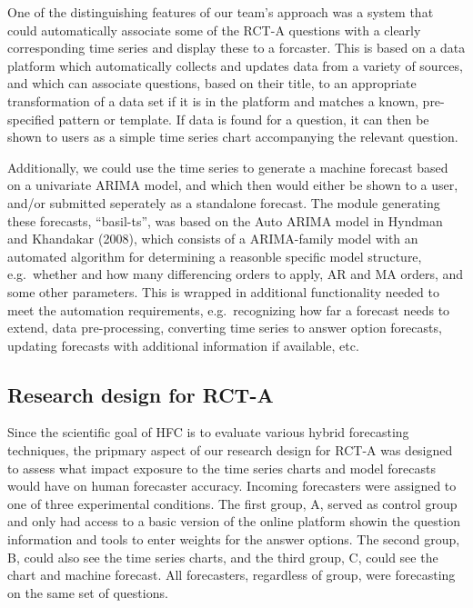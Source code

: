 \documentclass[]{article}
\begin{document}
One of the distinguishing features of our team's approach was a system
that could automatically associate some of the RCT-A questions with a
clearly corresponding time series and display these to a forcaster. This
is based on a data platform which automatically collects and updates
data from a variety of sources, and which can associate questions, based
on their title, to an appropriate transformation of a data set if it is
in the platform and matches a known, pre-specified pattern or template.
If data is found for a question, it can then be shown to users as a
simple time series chart accompanying the relevant question.

Additionally, we could use the time series to generate a machine
forecast based on a univariate ARIMA model, and which then would either
be shown to a user, and/or submitted seperately as a standalone
forecast. The module generating these forecasts, ``basil-ts'', was based
on the Auto ARIMA model in Hyndman and Khandakar (2008), which consists
of a ARIMA-family model with an automated algorithm for determining a
reasonble specific model structure, e.g.~whether and how many
differencing orders to apply, AR and MA orders, and some other
parameters. This is wrapped in additional functionality needed to meet
the automation requirements, e.g.~recognizing how far a forecast needs
to extend, data pre-processing, converting time series to answer option
forecasts, updating forecasts with additional information if available,
etc.

\subsection{Research design for RCT-A}\label{research-design-for-rct-a}

Since the scientific goal of HFC is to evaluate various hybrid
forecasting techniques, the pripmary aspect of our research design for
RCT-A was designed to assess what impact exposure to the time series
charts and model forecasts would have on human forecaster accuracy.
Incoming forecasters were assigned to one of three experimental
conditions. The first group, A, served as control group and only had
access to a basic version of the online platform showin the question
information and tools to enter weights for the answer options. The
second group, B, could also see the time series charts, and the third
group, C, could see the chart and machine forecast. All forecasters,
regardless of group, were forecasting on the same set of questions.
\end{document}
